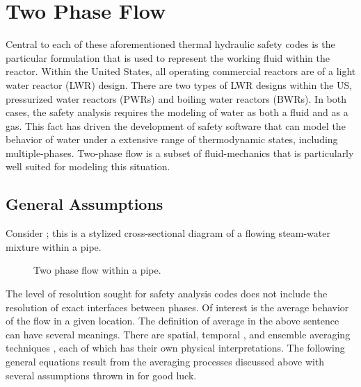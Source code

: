 \section{Two Phase Flow}
\label{sect:two_phase_flow}
Central to each of these aforementioned thermal hydraulic safety codes is the particular formulation that is used to represent the working fluid within the reactor.
Within the United States, all operating commercial reactors are of a light water reactor (LWR) design.
There are two types of LWR designs within the US, pressurized water reactors (PWRs) and boiling water reactors (BWRs).
In both cases, the safety analysis requires the modeling of water as both a fluid and as a gas.
This fact has driven the development of safety software that can model the behavior of water under a extensive range of thermodynamic states, including multiple-phases.
Two-phase flow is a subset of fluid-mechanics that is particularly well suited for modeling this situation.

\subsection{General Assumptions}
\label{subsect:assumptions}
Consider ; this is a stylized cross-sectional diagram of a flowing steam-water mixture within a pipe.

\begin{figure}[ht]
\caption{Two phase flow within a pipe.}
\label{fig:pipe_with_bubbles}
\begin{center}
\end{center}
\end{figure}

The level of resolution sought for safety analysis codes does not include the resolution of exact interfaces between phases.
Of interest is the average behavior of the flow in a given location.
The definition of average in the above sentence can have several meanings.
There are spatial\cite{Todreas}, temporal \cite{Ishi}, and ensemble averaging techniques \cite{Drew1998}, each of which has their own physical interpretations.
The following general equations result from the averaging processes discussed above with several assumptions thrown in for good luck.

